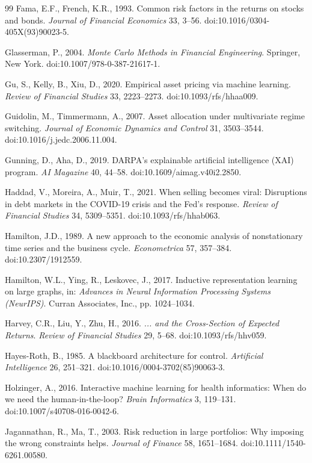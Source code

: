 \documentclass[11pt]{article}
\begin{document}
\begin{thebibliography}{99}
Fama, E.F., French, K.R., 1993. Common risk factors in the returns on stocks and bonds. \textit{Journal of Financial Economics} 33, 3--56. doi:10.1016/0304-405X(93)90023-5.

Glasserman, P., 2004. \textit{Monte Carlo Methods in Financial Engineering}. Springer, New York. doi:10.1007/978-0-387-21617-1.

Gu, S., Kelly, B., Xiu, D., 2020. Empirical asset pricing via machine learning. \textit{Review of Financial Studies} 33, 2223--2273. doi:10.1093/rfs/hhaa009.

Guidolin, M., Timmermann, A., 2007. Asset allocation under multivariate regime switching. \textit{Journal of Economic Dynamics and Control} 31, 3503--3544. doi:10.1016/j.jedc.2006.11.004.

Gunning, D., Aha, D., 2019. DARPA's explainable artificial intelligence (XAI) program. \textit{AI Magazine} 40, 44--58. doi:10.1609/aimag.v40i2.2850.

Haddad, V., Moreira, A., Muir, T., 2021. When selling becomes viral: Disruptions in debt markets in the COVID-19 crisis and the Fed's response. \textit{Review of Financial Studies} 34, 5309--5351. doi:10.1093/rfs/hhab063.

Hamilton, J.D., 1989. A new approach to the economic analysis of nonstationary time series and the business cycle. \textit{Econometrica} 57, 357--384. doi:10.2307/1912559.

Hamilton, W.L., Ying, R., Leskovec, J., 2017. Inductive representation learning on large graphs, in: \textit{Advances in Neural Information Processing Systems (NeurIPS)}. Curran Associates, Inc., pp. 1024--1034.

Harvey, C.R., Liu, Y., Zhu, H., 2016. \textit{... and the Cross-Section of Expected Returns}. \textit{Review of Financial Studies} 29, 5--68. doi:10.1093/rfs/hhv059.

Hayes-Roth, B., 1985. A blackboard architecture for control. \textit{Artificial Intelligence} 26, 251--321. doi:10.1016/0004-3702(85)90063-3.

Holzinger, A., 2016. Interactive machine learning for health informatics: When do we need the human-in-the-loop? \textit{Brain Informatics} 3, 119--131. doi:10.1007/s40708-016-0042-6.

Jagannathan, R., Ma, T., 2003. Risk reduction in large portfolios: Why imposing the wrong constraints helps. \textit{Journal of Finance} 58, 1651--1684. doi:10.1111/1540-6261.00580.


\end{thebibliography}
\end{document}
